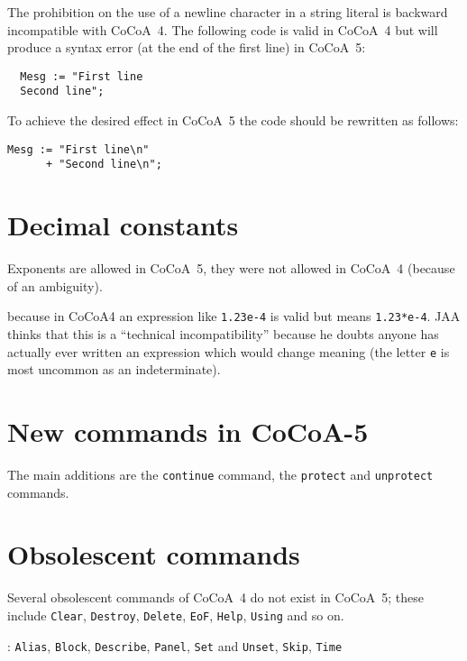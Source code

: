 \documentclass{book}[12,a4paper]
\begin{document}
The prohibition on the use of a newline character in a string literal is
backward incompatible with CoCoA~4.  The following code is valid in CoCoA~4
but will produce a syntax error (at the end of the first line) in CoCoA~5:
\begin{lstlisting}
  Mesg := "First line
  Second line";
\end{lstlisting}
To achieve the desired effect in CoCoA~5 the code should be rewritten as follows:
\begin{lstlisting}
Mesg := "First line\n"
      + "Second line\n";
\end{lstlisting}

\section{Decimal constants}

Exponents are allowed in CoCoA~5, they were not allowed in CoCoA~4 (because
of an ambiguity).

 because in CoCoA4
an expression like \verb|1.23e-4| is valid but means \verb|1.23*e-4|.  JAA
thinks that this is a ``technical incompatibility'' because he doubts
anyone has actually ever written an expression which would change meaning
(the letter \texttt{e} is most uncommon as an indeterminate).

\section{New commands in CoCoA-5}
\label{diff:commands}

The main additions are the \texttt{continue} command, the \texttt{protect} and
\texttt{unprotect} commands.

\section{Obsolescent commands}

Several obsolescent commands of CoCoA~4 do not exist in CoCoA~5; these
include \texttt{Clear}, \texttt{Destroy}, \texttt{Delete}, \texttt{EoF},
\texttt{Help}, \texttt{Using} and so on.

: \texttt{Alias}, \texttt{Block},
\texttt{Describe}, \texttt{Panel}, \texttt{Set} and \texttt{Unset},
\texttt{Skip}, \texttt{Time}
\end{document}
